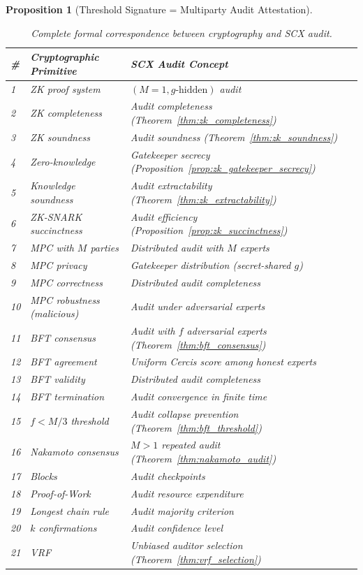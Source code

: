 \documentclass[12pt,a4paper]{article}
\newtheorem{proposition}[theorem]{Proposition}
\theoremstyle{remark}
\newcommand{\Cercis}{\textsf{Cercis}}
\begin{document}
\begin{proposition}[Threshold Signature = Multiparty Audit Attestation]
\begin{table}[H]
\centering
\caption{Complete formal correspondence between cryptography and SCX audit.}
\label{tab:crypto_scx}
\begin{tabular}{@{}lll@{}}
\toprule
\textbf{\#} & \textbf{Cryptographic Primitive} & \textbf{SCX Audit Concept} \\
\midrule
1 & ZK proof system & $(M=1, g\text{-hidden})$ audit \\
2 & ZK completeness & Audit completeness (Theorem~\ref{thm:zk_completeness}) \\
3 & ZK soundness & Audit soundness (Theorem~\ref{thm:zk_soundness}) \\
4 & Zero-knowledge & Gatekeeper secrecy (Proposition~\ref{prop:zk_gatekeeper_secrecy}) \\
5 & Knowledge soundness & Audit extractability (Theorem~\ref{thm:zk_extractability}) \\
6 & ZK-SNARK succinctness & Audit efficiency (Proposition~\ref{prop:zk_succinctness}) \\
\midrule
7 & MPC with $M$ parties & Distributed audit with $M$ experts \\
8 & MPC privacy & Gatekeeper distribution (secret-shared $g$) \\
9 & MPC correctness & Distributed audit completeness \\
10 & MPC robustness (malicious) & Audit under adversarial experts \\
\midrule
11 & BFT consensus & Audit with $f$ adversarial experts (Theorem~\ref{thm:bft_consensus}) \\
12 & BFT agreement & Uniform \Cercis{} score among honest experts \\
13 & BFT validity & Distributed audit completeness \\
14 & BFT termination & Audit convergence in finite time \\
15 & $f < M/3$ threshold & Audit collapse prevention (Theorem~\ref{thm:bft_threshold}) \\
\midrule
16 & Nakamoto consensus & $M > 1$ repeated audit (Theorem~\ref{thm:nakamoto_audit}) \\
17 & Blocks & Audit checkpoints \\
18 & Proof-of-Work & Audit resource expenditure \\
19 & Longest chain rule & Audit majority criterion \\
20 & $k$ confirmations & Audit confidence level \\
\midrule
21 & VRF & Unbiased auditor selection (Theorem~\ref{thm:vrf_selection}) \\

\end{tabular}
\end{table}
\end{proposition}
\end{document}
